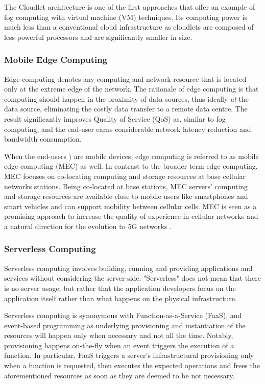 The Cloudlet \cite{cloudlet} architecture is one of the first approaches that offer an example of fog computing with virtual machine (VM) techniques. Its computing power is much less than a conventional cloud infrastructure as cloudlets are composed of less powerful processors and are significantly smaller in size.

\subsubsection{Mobile Edge Computing}

Edge computing \cite{edge-computing-vision-challenges} denotes any computing and network resource that is located only at the extreme edge of the network. The rationale of edge computing is that computing should happen in the proximity of data sources, thus ideally \emph{at} the data source, eliminating the costly data transfer to a remote data centre. The result significantly improves Quality of Service (QoS) as, similar to fog computing, and the end-user earns considerable network latency reduction and bandwidth consumption.

When the end-users ) are mobile devices, edge computing is referred to as mobile edge computing (MEC) \cite{mec} as well. In contrast to the broader term edge computing, MEC focuses on co-locating computing and storage resources at base cellular networks stations. Being co-located at base stations, MEC servers' computing and storage resources are available close to mobile users like smartphones and smart vehicles and can support mobility between cellular cells. MEC is seen as a promising approach to increase the quality of experience in cellular networks and a natural direction for the evolution to 5G networks \cite{nfv-5g}.

\subsubsection{Serverless Computing}

Serverless computing \cite{serverless-berkeley} involves building, running and providing applications and services without considering the server-side. "Serverless" does not mean that there is no server usage, but rather that the application developers focus on the application itself rather than what happens on the physical infrastructure.

Serverless computing is synonymous with Function-as-a-Service (FaaS), and event-based programming as underlying provisioning and instantiation of the resources will happen only when necessary and not all the time. Notably, provisioning happens on-the-fly when an event triggers the execution of a function. In particular, FaaS triggers a server's infrastructural provisioning only when a function is requested, then executes the expected operations and frees the aforementioned resources as soon as they are deemed to be not necessary.

